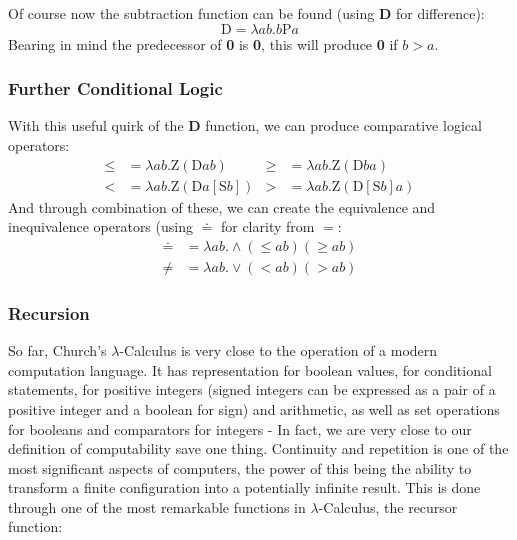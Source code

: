 \documentclass[Master.tex]{subfiles}
\begin{document}
Of course now the subtraction function can be found (using \textbf{D} for difference):
\begin{equation*}
\bm{\mathrm{D}} = \lambda ab.b\bm{\mathrm{P}}a
\end{equation*}
Bearing in mind the predecessor of \textbf{0} is \textbf{0}, this will produce \textbf{0} if $b>a$.
\subsubsection{Further Conditional Logic}

With this useful quirk of the \textbf{D} function, we can produce comparative logical operators:
\begin{equation*}
\begin{aligned}
\bm{\leq} &= \lambda ab.\bm{\mathrm{Z}}(\bm{\mathrm{D}}ab)
  & %
\bm{\geq} &= \lambda ab.\bm{\mathrm{Z}}(\bm{\mathrm{D}}ba)
  \\
\bm{<} &= \lambda ab.\bm{\mathrm{Z}}(\bm{\mathrm{D}}a[\bm{\mathrm{S}}b])
  &
\bm{>} &= \lambda ab.\bm{\mathrm{Z}}(\bm{\mathrm{D}}[\bm{\mathrm{S}}b]a)
\end{aligned}
\end{equation*}
And through combination of these, we can create the equivalence and inequivalence operators (using $\bm{\doteq}$ for clarity from $=$:
\begin{equation*}
\begin{aligned}
\bm{\doteq} &= \lambda ab.\wedge(\bm{\leq}ab)(\bm{\geq}ab)\\
\bm{\neq} &= \lambda ab.\vee(\bm{<}ab)(\bm{>}ab)
\end{aligned}
\end{equation*}
\subsubsection{Recursion}

So far, Church's $\lambda$-Calculus is very close to the operation of a modern computation language. It has representation for boolean values, for conditional statements, for positive integers (signed integers can be expressed as a pair of a positive integer and a boolean for sign) and arithmetic, as well as set operations for booleans and comparators for integers - In fact, we are very close to our definition of computability save one thing. Continuity and repetition is one of the most significant aspects of computers, the power of this being the ability to transform a finite configuration into a potentially infinite result. This is done through one of the most remarkable functions in $\lambda$-Calculus, the recursor function:
\end{document}

